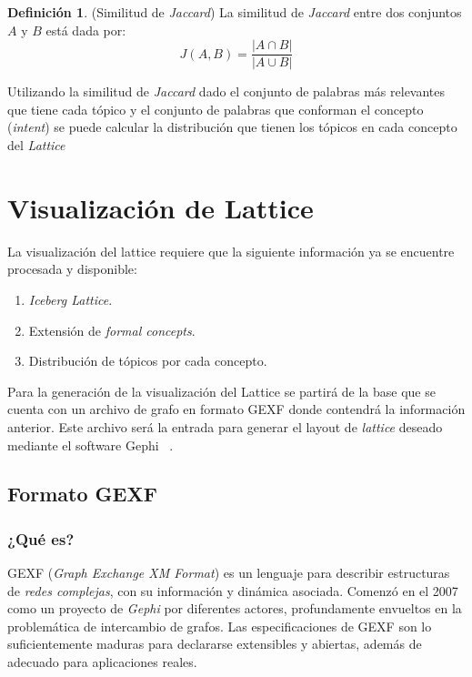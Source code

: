 \documentclass[12pt,oneside,letterpaper]{book}
\newcommand{\eng}[1]{\textit{#1}\xspace}			%
\newcommand{\abr}[1]{\textsc{#1}\xspace}           %
\theoremstyle{definition}
\newtheorem{definition}{Definición}[section]
\begin{document}
 \begin{definition}{(Similitud de \eng{Jaccard})}
 La similitud de \eng{Jaccard} entre dos conjuntos $A$ y $B$ está dada por:
 \begin{equation*}
	J(A,B) = \frac{\left\vert{A \cap B}\right\vert}{\left\vert{A \cup B}\right\vert}
\end{equation*}
 \end{definition}

 Utilizando la similitud de \eng{Jaccard} dado el conjunto de palabras más relevantes que tiene cada tópico y el conjunto de palabras que conforman el concepto (\eng{intent}) se puede calcular la distribución que tienen los tópicos en cada concepto del \eng{Lattice}

\section{Visualización de Lattice}
\label{sec:visualizacion_de_lattice}
La visualización del lattice requiere que la siguiente información ya se encuentre procesada y disponible:

\begin{enumerate}
	\item \eng{Iceberg Lattice}.
	\item Extensión de \eng{formal concepts}.
	\item Distribución de tópicos por cada concepto.
\end{enumerate}

Para la generación de la visualización del Lattice se partirá de la base que se cuenta con un archivo de grafo en formato \abr{GEXF} donde contendrá la información anterior. Este archivo será la entrada para generar el layout de \eng{lattice} deseado mediante el software Gephi ~\cite{gephi}.


\subsection{Formato \abr{GEXF}}
\label{sub:eng}

\subsubsection{¿Qué es?}
\abr{GEXF} (\eng{Graph Exchange XM Format}) es un lenguaje para describir estructuras de \emph{redes complejas}, con su información y dinámica asociada. Comenzó en el 2007 como un proyecto de \eng{Gephi} por diferentes actores, profundamente envueltos en la problemática de intercambio de grafos. Las especificaciones de \abr{GEXF} son lo suficientemente maduras para declararse extensibles y abiertas, además de adecuado para aplicaciones reales.
\end{document}
